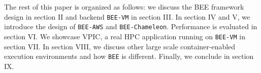 \begin{enumerate}

\end{enumerate}

The rest of this paper is organized as follows:  
we discuss the BEE framework design in section II and backend \texttt{BEE-VM} in section III. In section IV and V, we introduce the design of \texttt{BEE-AWS} and \texttt{BEE-Chameleon}. Performance is evaluated in section VI. We showcase VPIC, a real HPC application running on \texttt{BEE-VM} in section VII. In section VIII, we discuss other large scale container-enabled execution environments and how \texttt{BEE} is different. Finally, we conclude in section IX.





